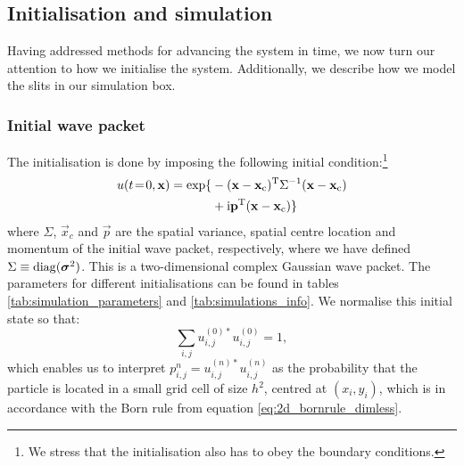 \subsection{Initialisation and simulation}\label{sec:methods:simulation}
    Having addressed methods for advancing the system in time, we now turn our attention to how we initialise the system. Additionally, we describe how we model the slits in our simulation box.  
    
    \subsubsection{Initial wave packet}\label{sec:methods:simulation:initial_wave}
        The initialisation is done by imposing the following initial condition:\footnote{We stress that the initialisation also has to obey the boundary conditions.} 
        \begin{equation}\label{eq:p4_initial_condition}
        \begin{split}
            u(t\!=\!0, \mathbf{x}) = \exp\{ &-(\mathbf{x}-\mathbf{x}_\mathrm{c})^\mathrm{T}\Sigma^{-1}(\mathbf{x}-\mathbf{x}_\mathrm{c}) \\ 
            &+ \mathrm{i} \mathbf{p}^\mathrm{T}(\mathbf{x}-\mathbf{x}_\mathrm{c})\}  
        \end{split}
        \end{equation}
        where $\Sigma$, $\vec{x}_c$ and $\vec{p}$ are the spatial variance, spatial centre location and momentum of the initial wave packet, respectively, where we have defined $\Sigma \equiv \mathrm{diag}(\boldsymbol{\sigma}^2)$. This is a two-dimensional complex Gaussian wave packet. The parameters for different initialisations can be found in tables \ref{tab:simulation_parameters} and \ref{tab:simulations_info}. We normalise this initial state so that:
        \begin{equation}
            \sum_{i,j}u_{i,j}^{(0)*}u_{i,j}^{(0)} = 1, 
        \end{equation}
        which enables us to interpret $p_{i,j}^{n} = u_{i,j}^{(n)*}u_{i,j}^{(n)}$ as the probability that the particle is located in a small grid cell of size $h^2$, centred at $(x_i, y_i)$, which is in accordance with the Born rule from equation \eqref{eq:2d_bornrule_dimless}.
    

